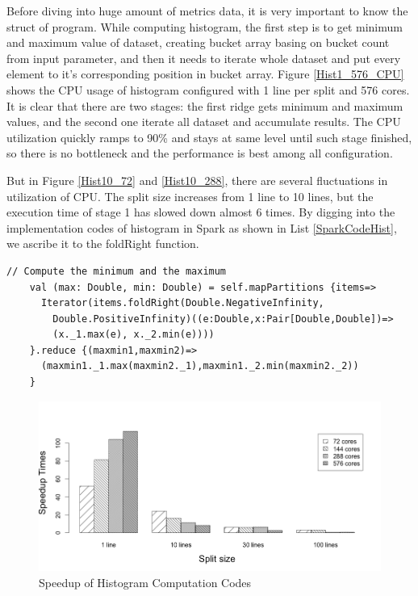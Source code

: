 Before diving into huge amount of metrics data, it is very important to know the struct of program. While computing histogram, the first step is to get minimum and maximum value of dataset, creating bucket array basing on bucket count from input parameter, and then it needs to iterate whole dataset and put every element to it's corresponding position in bucket array. Figure \ref{Hist1_576_CPU} shows the CPU usage of histogram configured with 1 line per split and 576 cores. It is clear that there are two stages: the first ridge gets minimum and maximum values, and the second one iterate all dataset and accumulate results. The CPU utilization quickly ramps to 90\% and stays at same level until such stage finished, so there is no bottleneck and the performance is best among all configuration.

But in Figure \ref{Hist10_72} and \ref{Hist10_288}, there are several fluctuations in utilization of CPU. The split size increases from 1 line to 10 lines, but the execution time of stage 1 has slowed down almost 6 times. By digging into the implementation codes of histogram in Spark as shown in List \ref{SparkCodeHist}, we ascribe it to the foldRight function. 

\lstset{language=Java,frame=single}
\begin{lstlisting}[float,caption= Codes Snippet of Histogram in Spark , label=SparkCodeHist]
    // Compute the minimum and the maximum
    val (max: Double, min: Double) = self.mapPartitions {items=>
      Iterator(items.foldRight(Double.NegativeInfinity,
        Double.PositiveInfinity)((e:Double,x:Pair[Double,Double])=>
        (x._1.max(e), x._2.min(e))))
    }.reduce {(maxmin1,maxmin2)=>
      (maxmin1._1.max(maxmin2._1),maxmin1._2.min(maxmin2._2))
    }
\end{lstlisting}


\begin{figure}[!ht]
\centering
\includegraphics[scale=.50]{figures/HistSpeedup.png}
\caption{Speedup of Histogram Computation Codes}
\label{HistSpeedup}
\end{figure}

